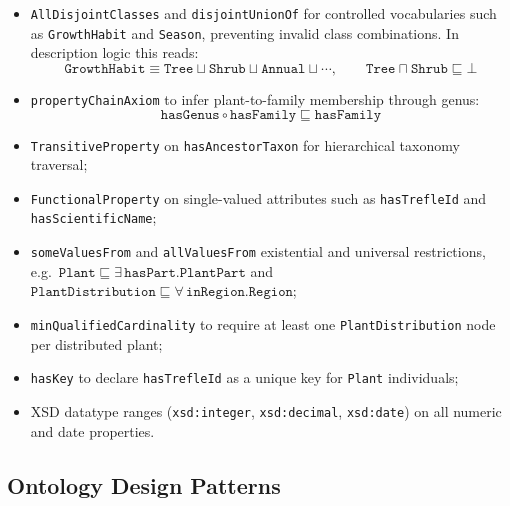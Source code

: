 \documentclass[11pt,a4paper]{article}
\begin{document}
\begin{itemize}
  \item \texttt{AllDisjointClasses} and \texttt{disjointUnionOf} for
        controlled vocabularies such as \texttt{GrowthHabit} and
        \texttt{Season}, preventing invalid class combinations.
        In description logic this reads:
        \[
          \texttt{GrowthHabit} \equiv \texttt{Tree} \sqcup \texttt{Shrub}
          \sqcup \texttt{Annual} \sqcup \cdots, \qquad
          \texttt{Tree} \sqcap \texttt{Shrub} \sqsubseteq \bot
        \]
  \item \texttt{propertyChainAxiom} to infer plant-to-family membership
        through genus:
        \[
          \texttt{hasGenus} \circ \texttt{hasFamily} \sqsubseteq \texttt{hasFamily}
        \]
  \item \texttt{TransitiveProperty} on \texttt{hasAncestorTaxon} for
        hierarchical taxonomy traversal;
  \item \texttt{FunctionalProperty} on single-valued attributes such as
        \texttt{hasTrefleId} and \texttt{hasScientificName};
  \item \texttt{someValuesFrom} and \texttt{allValuesFrom} existential and
        universal restrictions, e.g.\
        $\texttt{Plant} \sqsubseteq \exists\,\texttt{hasPart.PlantPart}$
        and
        $\texttt{PlantDistribution} \sqsubseteq \forall\,\texttt{inRegion.Region}$;
  \item \texttt{minQualifiedCardinality} to require at least one
        \texttt{PlantDistribution} node per distributed plant;
  \item \texttt{hasKey} to declare \texttt{hasTrefleId} as a unique key for
        \texttt{Plant} individuals;
  \item XSD datatype ranges (\texttt{xsd:integer}, \texttt{xsd:decimal},
        \texttt{xsd:date}) on all numeric and date properties.
\end{itemize}

\subsection{Ontology Design Patterns}
\end{document}
